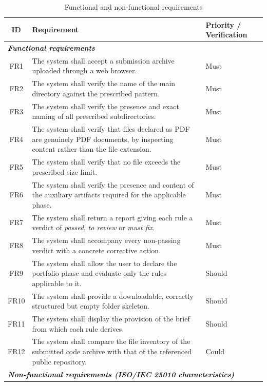 \documentclass[a4paper,11pt]{article}
\begin{document}
\begin{table}[H]
\centering
\caption{Functional and non-functional requirements}
\label{tab:requirements}
\footnotesize
\renewcommand{\arraystretch}{1.25}
\setlength{\tabcolsep}{4pt}
\begin{tabularx}{\textwidth}{|c|X|p{2.9cm}|}
\hline
\rowcolor{gray!15}
\textbf{ID} & \textbf{Requirement} & \textbf{Priority / Verification} \\
\hline
\hline
\multicolumn{3}{|l|}{\cellcolor{blue!8}\textit{\textbf{Functional requirements}}} \\
\hline
FR1 & The system shall accept a submission archive uploaded through a web browser. & Must \\
\hline
FR2 & The system shall verify the name of the main directory against the prescribed pattern. & Must \\
\hline
FR3 & The system shall verify the presence and exact naming of all prescribed subdirectories. & Must \\
\hline
FR4 & The system shall verify that files declared as PDF are genuinely PDF documents, by inspecting content rather than the file extension. & Must \\
\hline
FR5 & The system shall verify that no file exceeds the prescribed size limit. & Must \\
\hline
FR6 & The system shall verify the presence and content of the auxiliary artifacts required for the applicable phase. & Must \\
\hline
FR7 & The system shall return a report giving each rule a verdict of \textit{passed}, \textit{to review} or \textit{must fix}. & Must \\
\hline
FR8 & The system shall accompany every non-passing verdict with a concrete corrective action. & Must \\
\hline
FR9 & The system shall allow the user to declare the portfolio phase and evaluate only the rules applicable to it. & Should \\
\hline
FR10 & The system shall provide a downloadable, correctly structured but empty folder skeleton. & Should \\
\hline
FR11 & The system shall display the provision of the brief from which each rule derives. & Should \\
\hline
FR12 & The system shall compare the file inventory of the submitted code archive with that of the referenced public repository. & Could \\
\hline
\hline
\multicolumn{3}{|l|}{\cellcolor{blue!8}\textit{\textbf{Non-functional requirements (ISO/IEC 25010 characteristics)}}} \\

\end{tabularx}
\end{table}
\end{document}
